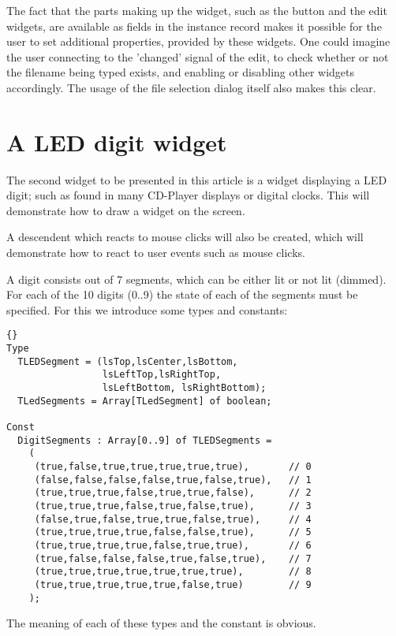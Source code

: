 \documentclass[10pt]{article}
\begin{document}
The fact that the parts making up the widget, such as the button and the edit
widgets, are available as fields in the instance record makes it possible
for the user to set additional properties, provided by these widgets. One
could imagine the user connecting to the 'changed' signal of the edit, to
check whether or not the filename being typed exists, and enabling or 
disabling other widgets accordingly. The usage of the file selection dialog
itself also makes this clear. 

\section{A LED digit widget}
The second widget to be presented in this article is a widget displaying 
a LED digit; such as found in many CD-Player displays or digital clocks.
This will demonstrate how to draw a widget on the screen.

A descendent which reacts to mouse clicks will also be created, which will
demonstrate how to react to user events such as mouse clicks.

A digit consists out of 7 segments, which can be either lit or not lit
(dimmed). For each of the 10 digits (0..9) the state of each of the segments
must be specified. For this we introduce some types and constants:
\begin{lstlisting}{}
Type
  TLEDSegment = (lsTop,lsCenter,lsBottom,
                 lsLeftTop,lsRightTop,
                 lsLeftBottom, lsRightBottom);
  TLedSegments = Array[TLedSegment] of boolean;
  
Const 
  DigitSegments : Array[0..9] of TLEDSegments = 
    (
     (true,false,true,true,true,true,true),       // 0
     (false,false,false,false,true,false,true),   // 1
     (true,true,true,false,true,true,false),      // 2                
     (true,true,true,false,true,false,true),      // 3
     (false,true,false,true,true,false,true),     // 4
     (true,true,true,true,false,false,true),      // 5
     (true,true,true,true,false,true,true),       // 6
     (true,false,false,false,true,false,true),    // 7
     (true,true,true,true,true,true,true),        // 8
     (true,true,true,true,true,false,true)        // 9
    );
\end{lstlisting}
The meaning of each of these types and the constant is obvious.
\end{document}
